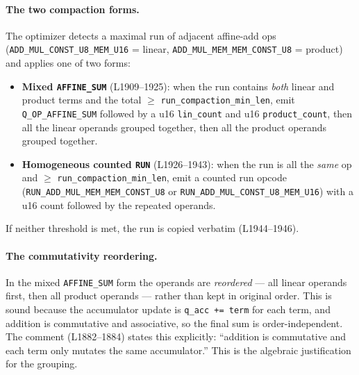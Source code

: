 \paragraph{The two compaction forms.}
The optimizer detects a maximal run of adjacent affine-add ops
(\texttt{ADD\_\allowbreak{}MUL\_\allowbreak{}CONST\_\allowbreak{}U8\_\allowbreak{}MEM\_\allowbreak{}U16} = linear,
\texttt{ADD\_\allowbreak{}MUL\_\allowbreak{}MEM\_\allowbreak{}MEM\_\allowbreak{}CONST\_\allowbreak{}U8} = product) and applies one
of two forms:
\begin{itemize}[leftmargin=1.4em,itemsep=2pt]
\item \textbf{Mixed \texttt{AFFINE\_SUM}} (L1909--1925): when the
  run contains \emph{both} linear and product terms and the total
  $\ge$ \texttt{run\_\allowbreak{}compaction\_\allowbreak{}min\_\allowbreak{}len}, emit
  \texttt{Q\_\allowbreak{}OP\_\allowbreak{}AFFINE\_\allowbreak{}SUM} followed by a u16 \texttt{lin\_count}
  and u16 \texttt{product\_count}, then all the linear operands
  grouped together, then all the product operands grouped
  together.
\item \textbf{Homogeneous counted \texttt{RUN}} (L1926--1943):
  when the run is all the \emph{same} op and
  $\ge$ \texttt{run\_\allowbreak{}compaction\_\allowbreak{}min\_\allowbreak{}len}, emit a counted run
  opcode (\texttt{RUN\_\allowbreak{}ADD\_\allowbreak{}MUL\_\allowbreak{}MEM\_\allowbreak{}MEM\_\allowbreak{}CONST\_\allowbreak{}U8} or
  \texttt{RUN\_\allowbreak{}ADD\_\allowbreak{}MUL\_\allowbreak{}CONST\_\allowbreak{}U8\_\allowbreak{}MEM\_\allowbreak{}U16}) with a u16 count
  followed by the repeated operands.
\end{itemize}
If neither threshold is met, the run is copied verbatim
(L1944--1946).

\paragraph{The commutativity reordering.}
In the mixed \texttt{AFFINE\_SUM} form the operands are
\emph{reordered} --- all linear operands first, then all product
operands --- rather than kept in original order. This is sound
because the accumulator update is \texttt{q\_acc += term} for
each term, and addition is commutative and associative, so the
final sum is order-independent. The comment (L1882--1884) states
this explicitly: ``addition is commutative and each term only
mutates the same accumulator.'' This is the algebraic justification
for the grouping.

